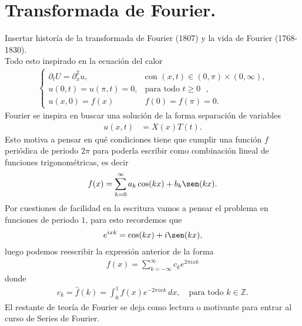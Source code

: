 \section{Transformada de Fourier.}
  Insertar historía de la transformada de Fourier (1807) y la vida de Fourier (1768-1830).\\
  Todo esto inspirado en la ecuación del calor
  \begin{align*}
    \begin{cases}
      \partial_{t}U=\partial^{2}_{x}u,&\text{con $(x,t)\in(0,\pi)\times (0,\infty)$,}\\
      u(0,t)=u(\pi,t)=0, &\text{para todo $t\geq 0$ },\\
      u(x,0)=f(x)&f(0)=f(\pi)=0.
    \end{cases}
  \end{align*}
  Fourier se inspira en buscar una solución de la forma separación de variables
  \begin{align*}
    u(x,t)&=X(x)T(t).
  \end{align*}
  Esto motiva a pensar en qué condiciones tiene que cumplir una función $f$ periódica de periodo $2\pi$ para poderla escribir como combinación lineal de funciones trigonométricas, es decir
  \begin{align*}
    f(x)=\sum_{k=0}^{\infty}a_{k}\cos(kx)+b_k\sen(kx).
  \end{align*}
  Por cuestiones de facilidad en la escritura vamos a pensar el problema en funciones de periodo $1$, para esto recordemos que
  \begin{align*}
    e^{ixk}=\cos(kx)+i\sen(kx),
  \end{align*}
  luego podemos reescribir la expresión anterior de la forma
  \begin{align*}
    f(x)=\sum_{k=-\infty}^{\infty}c_{k}e^{2\pi ixk}
  \end{align*}
  donde
  \begin{align*}
    c_{k}=\hat{f}(k)=\int_{0}^{1}f(x)e^{-2\pi i xk}\,dx,\quad\text{para todo $k\in\mathbb{Z}$.}
  \end{align*}
  El restante de teoría de Fourier se deja como lectura o motivante para entrar al curso de Series de Fourier.
